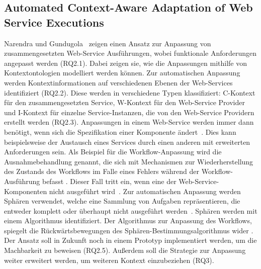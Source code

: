 \documentclass[conference,compsoc,ngerman]{IEEEtran}
\begin{document}
\subsection{Automated Context-Aware Adaptation of Web Service Executions}
Narendra und Gundugola~\cite{narendra2006automated} zeigen einen Ansatz zur Anpassung von zusammengesetzten Web-Service Ausführungen, wobei funktionale Anforderungen angepasst werden (RQ2.1). Dabei zeigen sie, wie die Anpassungen mithilfe von Kontextontologien modelliert werden können. Zur automatischen Anpassung werden Kontextinformationen auf verschiedenen Ebenen der Web-Services identifiziert (RQ2.2). Diese werden in verschiedene Typen klassifiziert: C-Kontext für den zusammengesetzten Service, W-Kontext für den Web-Service Provider und I-Kontext für einzelne Service-Instanzen, die von den Web-Service Providern erstellt werden (RQ2.3)\cite{narendra2006automated}. Anpassungen in einem Web-Service werden immer dann benötigt, wenn sich die Spezifikation einer Komponente ändert~\cite{narendra2006automated}. Dies kann beispielsweise der Austausch eines Services durch einen anderen mit erweiterten Anforderungen sein.
Als Beispiel für die Workflow-Anpassung wird die Ausnahmebehandlung genannt, die sich mit Mechanismen zur Wiederherstellung des Zustands des Workflows im Falle eines Fehlers während der Workflow-Ausführung befasst \cite{narendra2006automated}. Dieser Fall tritt ein, wenn eine der Web-Service-Komponenten nicht ausgeführt wird~\cite{narendra2006automated}.
Zur automatischen Anpassung werden Sphären verwendet, welche eine Sammlung von Aufgaben repräsentieren, die entweder komplett oder überhaupt nicht ausgeführt werden~\cite{narendra2006automated}. Sphären werden mit einem Algorithmus identifiziert. Der Algorithmus zur Anpassung des Workflows, spiegelt die Rückwärtsbewegungen des Sphären-Bestimmungsalgorithmus wider \cite{narendra2006automated}.
Der Ansatz soll in Zukunft noch in einem Prototyp implementiert werden, um die Machbarkeit zu beweisen (RQ2.5). Außerdem soll die Strategie zur Anpassung weiter erweitert werden, um weiteren Kontext einzubeziehen (RQ3).
\end{document}

